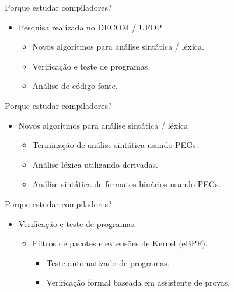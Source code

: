 \begin{frame}{Porque estudar compiladores?}

    \begin{itemize}

        \item
        Pesquisa realizada no DECOM / UFOP

        \begin{itemize}

            \item
            Novos algoritmos para análise sintática / léxica.
            \item
            Verificação e teste de programas.
            \item
            Análise de código fonte.
        \end{itemize}
    \end{itemize}
\end{frame}

\begin{frame}{Porque estudar compiladores?}

    \begin{itemize}

        \item
        Novos algoritmos para análise sintática / léxica

        \begin{itemize}

            \item
            Terminação de análise sintática usando PEGs.
            \item
            Análise léxica utilizando derivadas.
            \item
            Análise sintática de formatos binários usando PEGs.
        \end{itemize}
    \end{itemize}
\end{frame}

\begin{frame}{Porque estudar compiladores?}

    \begin{itemize}

        \item
        Verificação e teste de programas.

        \begin{itemize}

            \item
            Filtros de pacotes e extensões de Kernel (eBPF).

            \begin{itemize}

                \item
                Teste automatizado de programas.
                \item
                Verificação formal baseada em assistente de provas.
            \end{itemize}
        \end{itemize}
    \end{itemize}
\end{frame}

